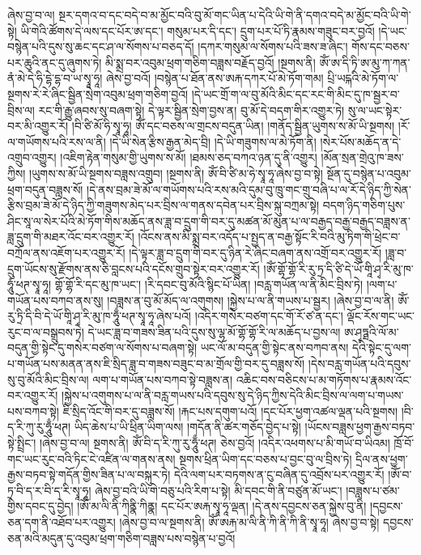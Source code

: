 ཞེས་བྱ་བ་ལ། སྔར་དགའ་བ་དང་བདེ་བ་མ་མྱོང་བའི་བུ་མོ་གང་ཡིན་པ་དེའི་ཡི་གེ་ནི་དགའ་བདེ་མ་མྱོང་བའི་ཡི་གེ་སྟེ། ཡི་གེའི་ཚོགས་དེ་ལས་དང་པོར་ཨ་དང་། གསུམ་པར་དི་དང་། དྲུག་པར་པོ་ཏི་རྣམས་གཟུང་བར་བྱའོ། །དེ་ཡང་བསྙེན་པའི་དུས་སུ་ཆང་དང་ཤ་ལ་སོགས་པ་བཅད་དོ། །དཀར་གསུམ་ལ་སོགས་པའི་ཟས་ཟ་ཞིང་། གོས་དང་བཅས་པར་ཆུའི་ནང་དུ་ཞུགས་ཏེ། མི་སྨྲ་བར་འབུམ་ཕྲག་གཅིག་བཟླས་བརྗོད་བྱའོ། །སྔགས་ནི། ཨོཾ་ཨ་དི་ཏི་ཨ་མུ་ཀ་ཀན་ནཾ་མེ་དེ་ཧི་དྷེ་དྷ་བ་ཡ་སྭཱ་ཧཱ། ཞེས་བྱ་བའོ། །བསྙེན་པ་ཐོན་ནས་ཨརྐ་དཀར་པོ་མེ་ཏོག་གམ། པྲི་ཡངྐའི་མེ་ཏོག་ལ་སྔགས་རེ་རེ་ཞིང་སྦྱིན་སྲེག་འབུམ་ཕྲག་གཅིག་བྱའོ། །དེ་ཡང་གྲོ་ག་ལ་བུ་མོའི་མིང་དང་རང་གི་མིང་དུ་ཁ་སྦྱར་བ་བྲིས་ལ། རང་གི་རྒྱུ་ཞབས་སུ་བཞག་སྟེ། དེ་ལྟར་སྦྱིན་སྲེག་བྱས་ན། བུ་མོ་དེ་བདག་གིར་འགྱུར་ཏེ། སུ་ལ་ཡང་སྟེར་བར་མི་འགྱུར་རོ། །བི་ཙི་མོ་ཧི་སྭཱ་ཧཱ། ཨོཾ་དང་བཅས་ལ་གྲངས་བདུན་ཡིན། །གནོད་སྦྱིན་ཡུགས་ས་མོ་ཡི་སྔགས། །རོ་ལ་གཡོགས་པའི་རས་ལ་ནི། །དེ་ཡི་སེན་རྩིས་རྒྱན་མེད་བྲི། །དེ་ཡི་གཟུགས་ལ་མེ་ཏོག་ནི། །སེར་པོས་མཆོད་ན་དེ་འགྲུབ་འགྱུར། །འཇིག་རྟེན་གསུམ་གྱི་ཡུགས་ས་མོ། །ཐམས་ཅད་བཀའ་ཉན་དུ་ནི་འགྱུར། །མོན་སྲན་གྲེའུ་ཁ་ཟས་ཀྱིས། །ཡུགས་ས་མོ་ཡི་སྔགས་བཟླས་འགྲུབ། །སྔགས་ནི། ཨོཾ་བི་ཙི་མ་ཧེ་སྭཱ་ཧཱ་ཞེས་བྱ་བ་སྟེ། སྔོན་དུ་བསྙེན་པ་འབུམ་ཕྲག་བདུན་བཟླས་སོ། །དེ་ནས་བྲམ་ཟེ་མོ་ལ་གཡོགས་པའི་རས་མའི་དུམ་བུ་ཁྲུ་གང་གྲུ་བཞི་པ་ལ་རོ་དེ་ཉིད་ཀྱི་སེན་རྩིས་བྲམ་ཟེ་མོ་དེ་ཉིད་ཀྱི་གཟུགས་མེད་པར་བྲིས་ལ་གནས་དབེན་པར་བྲིས་སྐུ་བཀྲམ་སྟེ། བདག་ཉིད་གཅིག་པུས་ཤིང་སཱ་ལ་སེར་པོའི་མེ་ཏོག་གིས་མཆོད་ནས་ཟླ་བ་དྲུག་གི་བར་དུ་མཚན་མོ་མུན་པ་ལ་བརྒྱད་བརྒྱ་བརྒྱད་བཟླས་ན་ཟླ་དྲུག་གི་མཐར་འོང་བར་འགྱུར་རོ། །འོངས་ནས་མི་སྨྲ་བར་འདོད་པ་སྤྱད་ན་བརྒྱ་སྟོང་རི་བའི་མུ་ཏིག་གི་ཕྲེང་བ་བཀྲོལ་ནས་འཇོག་པར་འགྱུར་རོ། །དེ་ལྟར་ཟླ་བ་དྲུག་གི་བར་དུ་ཉིན་རེ་ཞིང་བཞག་ནས་འགྲོ་བར་འགྱུར་རོ། །ཟླ་བ་དྲུག་ཡོངས་སུ་རྫོགས་ནས་ཅི་བླངས་པའི་དངོས་གྲུབ་སྟེར་བར་འགྱུར་རོ། །ཨོཾ་གྷོ་གྷོ་རི་རུ་ཏྲ་དི་ཙི་དེ་ཡོ་གཱི་ཤྭ་རི་མུ་ཁ་ཧཱུཾ་ཕཊ་སྭཱ་ཧཱ། གྷོ་གྷོ་རི་དང་མུ་ཁ་ཡང་། །རི་དབང་བུ་མོའི་སྙིང་པོ་ཡིན། །བརླ་གཡོན་ལ་ནི་མིང་བྲིས་ཏེ། །ལག་པ་གཡོན་པས་བཀབ་ནས་སུ། །བཟླས་ན་བུ་མོ་མོད་ལ་འགུགས། །སྐྱེས་པ་ལ་ནི་གཡས་པ་སྦྱར། །ཞེས་བྱ་བ་ལ་ནི། ཨོཾ་རུ་ཏྲི་དི་བི་དེ་ཡོ་གཱི་ཤྭ་རི་མུ་ཁ་ཧཱུྃ་ཕཊ་སྭཱ་ཧཱ་ཞེས་པའོ། །འདིར་གསེར་བཙག་དང་གོ་རོ་ཙ་ན་དང་། ལྡོང་རོས་གང་ཡང་རུང་བ་ལ་བསྒྲུབས་ཏེ། དེ་ཡང་ཟླ་བ་གཟས་ཟིན་པའི་དུས་སུ་ལྷ་མོ་གྷོ་གྷོ་རི་ལ་མཆོད་པ་བྱས་ལ། ཨ་ཤྭཏྠའི་ལོ་མ་བདུན་གྱི་སྟེང་དུ་གསེར་བཙག་ལ་སོགས་པ་བཞག་སྟེ། ཡང་ལོ་མ་བདུན་གྱི་སྟེང་ནས་བཀབ་ནས། དེའི་སྟེང་དུ་ལག་པ་གཡོན་པས་མནན་ནས་ཇི་སྲིད་ཟླ་བ་གཟས་བཟུང་བ་མ་གྲོལ་གྱི་བར་དུ་བཟླས་སོ། །དེས་བརླ་གཡོན་པའི་དབུས་སུ་བུ་མོའི་མིང་བྲིས་ལ། ལག་པ་གཡོན་པས་བཀབ་སྟེ་བཟླས་ན། འཆིང་བས་བཅིངས་པ་མ་གཏོགས་པ་རྣམས་འོང་བར་འགྱུར་རོ། །སྐྱེས་པ་འགུགས་པ་ལ་ནི་བརླ་གཡས་པའི་དབུས་སུ་དེ་ཉིད་ཀྱིས་དེའི་མིང་བྲིས་ལ་ལག་པ་གཡས་པས་བཀབ་སྟེ། ཇི་སྲིད་འོང་གི་བར་དུ་བཟླས་སོ། །རྐང་པས་དགུག་པའོ། །དང་པོར་ཕྱག་འཚལ་ལྡན་པའི་སྔགས། །བི་ད་རི་ཀུ་རུ་ཧཱུྃ་ཕཊ། ཡིད་ཆེས་པ་ཡི་ཕྲིན་ཡིག་ལས། །གདོན་ནི་ཚར་གཅོད་བྱེད་པ་སྟེ། །ཡོངས་བཟླས་ཕྱག་རྒྱས་བཏབ་སྟེ་སྤྲིང་། །ཞེས་བྱ་བ་ལ། སྔགས་ནི། ཨོཾ་བི་ད་རི་ཀུ་རུ་ཧཱུྃ་ཕཊ། ཅེས་བྱའོ། །འདིར་འཕགས་པ་མི་གཡོ་བ་ཡིའམ། ཁྲོ་བོ་གང་ཡང་རུང་བའི་ཏིང་ངེ་འཛིན་ལ་གནས་ནས། སྔགས་ཕྲིན་ཡིག་དང་བཅས་པ་བྱང་བུ་ལ་བྲིས་ཏེ། དྲིལ་ནས་ཕྱག་རྒྱས་བཏབ་སྟེ་གདོན་གྱིས་ཟིན་པ་ལ་བསྐུར་ཏེ། དེའི་ལག་པར་བཏགས་ན་ངུ་བཞིན་དུ་འབྲོས་པར་འགྱུར་རོ། །ཨོཾ་བ་ཏྲ་བི་ད་ར་བི་ད་རི་སྭཱ་ཧཱ། ཞེས་བྱ་བའི་ཡི་གེ་བཅུ་པའི་རིག་པ་སྟེ། མི་དབང་གི་ནི་བཙུན་མོ་ཡང་། །བཟླས་པ་ཙམ་གྱིས་དབང་དུ་བྱེད། །ཨོཾ་མ་ལི་ནི་ཀིནྣི་ཀིནྣ། དང་པོར་ཨརྐ་སྭཱ་ཧཱ་ལྡན། །དེ་ནས་དབྱངས་ཅན་སྐྱེས་བུ་ནི། །དབྱངས་ཅན་དག་ནི་འཐོབ་པར་འགྱུར། །ཞེས་བྱ་བ་ལ་སྔགས་ནི། ཨོཾ་ཨརྐ་མ་ལི་ནི་ཀི་ནི་ཀི་ནི་སྭཱ་ཧཱ། ཞེས་བྱ་བ་སྟེ། དབྱངས་ཅན་མའི་མདུན་དུ་འབུམ་ཕྲག་གཅིག་བཟླས་པས་བསྙེན་པ་བྱའོ། 